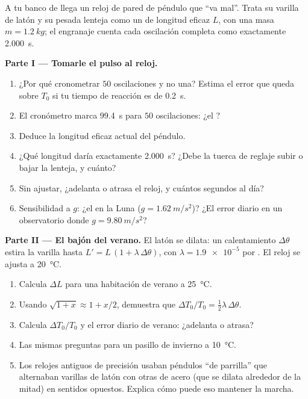 \begin{problem}
\label{pb:g12:oscillators-and-time:1}
A tu banco de  llega un reloj de pared de péndulo que ``va mal''. Trata su
varilla de latón y su pesada lenteja como un  de longitud eficaz $L$,
con una masa $m = \qty{1.2}{kg}$; el engranaje cuenta cada oscilación completa como
exactamente \qty{2.000}{s}.

\medskip
\noindent\textbf{Parte I --- Tomarle el pulso al reloj.}
\begin{enumerate}
  \item ¿Por qué cronometrar $50$ oscilaciones y no una? Estima el error que queda
        sobre $T_0$ si tu tiempo de reacción es de \qty{0.2}{s}.
  \item El cronómetro marca \qty{99.4}{s} para $50$ oscilaciones: ¿el ?
  \item Deduce la longitud eficaz actual del péndulo.
  \item ¿Qué longitud daría exactamente \qty{2.000}{s}? ¿Debe la tuerca de reglaje
        subir o bajar la lenteja, y cuánto?
  \item Sin ajustar, ¿adelanta o atrasa el reloj, y cuántos segundos al día?
  \item Sensibilidad a $g$: ¿el  en la Luna ($g = \qty{1.62}{m/s^2}$)? ¿El
        error diario en un observatorio donde $g = \qty{9.80}{m/s^2}$?
\end{enumerate}

\medskip
\noindent\textbf{Parte II --- El bajón del verano.} El latón se dilata: un
calentamiento $\Delta\theta$ estira la varilla hasta
$L' = L\,(1 + \lambda\, \Delta\theta)$, con $\lambda = \num{1.9e-5}$ por . El
reloj se ajusta a \qty{20}{\celsius}.
\begin{enumerate}[resume]
  \item Calcula $\Delta L$ para una habitación de verano a \qty{25}{\celsius}.
  \item Usando $\sqrt{1+x} \approx 1 + x/2$, demuestra que
        $\Delta T_0 / T_0 = \tfrac12 \lambda\, \Delta\theta$.
  \item Calcula $\Delta T_0/T_0$ y el error diario de verano: ¿adelanta o atrasa?
  \item Las mismas preguntas para un pasillo de invierno a \qty{10}{\celsius}.
  \item Los relojes antiguos de precisión usaban péndulos ``de parrilla'' que
        alternaban varillas de latón con otras de acero (que se dilata alrededor de la
        mitad) en sentidos opuestos. Explica cómo puede eso mantener la marcha.
\end{enumerate}


\end{problem}
